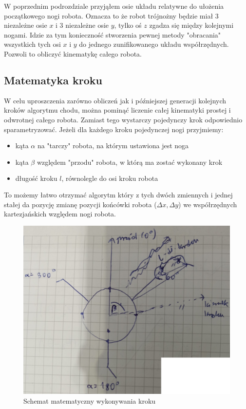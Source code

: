 W poprzednim podrozdziale przyjąłem osie układu relatywne do ułożenia początkowego nogi robota. Oznacza to że robot trójnożny będzie miał 3 niezależne osie $x$ i 3 niezależne osie $y$, tylko oś $z$ zgadza się między kolejnymi nogami. Idzie za tym konieczność stworzenia pewnej metody "obracania" wszystkich tych osi $x$ i $y$ do jednego zunifikowanego układu współrzędnych. Pozwoli to obliczyć kinematykę całego robota.

\subsection{Matematyka kroku}
W celu uproszczenia zarówno obliczeń jak i późniejszej generacji kolejnych kroków algorytmu chodu, można pominąć liczenie całej kinematyki prostej i odwrotnej całego robota. Zamiast tego wystarczy pojedynczy krok odpowiednio sparametryzować. Jeżeli dla każdego kroku pojedynczej nogi przyjmiemy:
\begin{itemize}[noitemsep]
\item kąta $\alpha$ na "tarczy" robota, na którym ustawiona jest noga
\item kąta $\beta$ względem "przodu" robota, w którą ma zostać wykonany krok
\item długość kroku $l$, równolegle do osi kroku robota
\end{itemize}
To możemy łatwo otrzymać algorytm który z tych dwóch zmiennych i jednej stałej da pozycję zmianę pozycji końcówki robota ($\Delta x, \Delta y$) we współrzędnych kartezjańskich względem nogi robota.

\begin{figure}[h!]
\includegraphics[width=\textwidth]{img/step_math.jpg}
\caption{Schemat matematyczny wykonywania kroku}
\label{step_math}
\end{figure}


